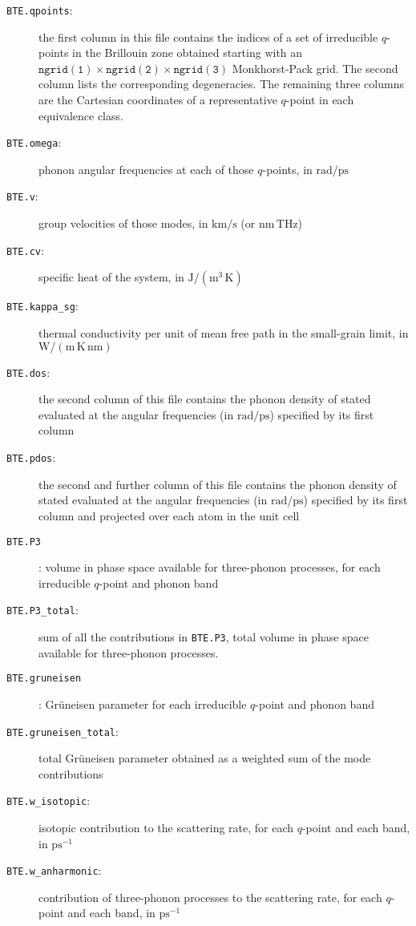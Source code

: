 \documentclass[a4paper,10pt,english]{article}
\begin{document}
\begin{description}
\item[\texttt{BTE.qpoints}:] the first column in this file contains the indices of a set of irreducible $q$-points in the Brillouin zone obtained starting with an $\mathtt{ngrid\left(1\right)}\times\mathtt{ngrid\left(2\right)}\times\mathtt{ngrid\left(3\right)}$ Monkhorst-Pack grid. The second column lists the corresponding degeneracies. The remaining three columns are the Cartesian coordinates of a representative $q$-point in each equivalence class.
\item[\texttt{BTE.omega}:] phonon angular frequencies at each of those $q$-points, in $\mathrm{rad/ps}$
\item[\texttt{BTE.v}:] group velocities of those modes, in $\mathrm{km/s}$ (or $\mathrm{nm}\,\mathrm{THz}$)
\item[\texttt{BTE.cv}:] specific heat of the system, in $\mathrm{J/\left(m^3\,K\right)}$
\item[\texttt{BTE.kappa\_sg}:] thermal conductivity per unit of mean free path in the small-grain limit, in $\mathrm{W/\left(m\,K\,nm\right)}$
\item[\texttt{BTE.dos}:] the second column of this file contains the phonon density of stated evaluated at the angular frequencies (in $\mathrm{rad/ps}$) specified by its first column
\item[\texttt{BTE.pdos}:] the second and further column of this file contains the phonon density of stated evaluated at the angular frequencies (in $\mathrm{rad/ps}$) specified by its first column and projected over each atom in the unit cell
\item[\texttt{BTE.P3}]: volume in phase space available for three-phonon processes, for each irreducible $q$-point and phonon band
\item[\texttt{BTE.P3\_total}:] sum of all the contributions in \texttt{BTE.P3}, total volume in phase space available for three-phonon processes.
\item[\texttt{BTE.gruneisen}]: Gr\"uneisen parameter for each irreducible $q$-point and phonon band
\item[\texttt{BTE.gruneisen\_total}:] total Gr\"uneisen parameter obtained as a weighted sum of the mode contributions
\item[\texttt{BTE.w\_isotopic}:] isotopic contribution to the scattering rate, for each $q$-point and each band, in $\mathrm{ps^{-1}}$
\item[\texttt{BTE.w\_anharmonic}:] contribution of three-phonon processes to the scattering rate, for each $q$-point and each band, in $\mathrm{ps^{-1}}$

\end{description}
\end{document}
